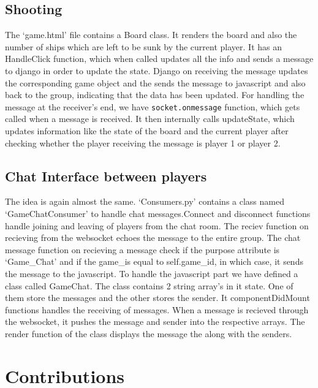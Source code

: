 \documentclass[titlepage]{article}
\begin{document}
\subsection{Shooting}
The `game.html' file contains a Board class. It renders the board and also the number of ships which are left to be sunk by the current player. It has an HandleClick function, which when called updates all the info and sends a message to django in order to update the state. Django on receiving the message updates the corresponding game object and the sends the message to javascript and also back to the group, indicating that the data has been updated.
For handling the message at the receiver's end, we have \texttt{socket.onmessage} function, which gets called when a message is received. It then internally calls updateState, which updates information like the state of the board and the current player after checking whether the player receiving the message is player 1 or player 2.

\subsection{Chat Interface between players}
The idea is again almost the same. `Consumers.py' contains a class named `GameChatConsumer' to handle chat messages.Connect and disconnect functions handle joining and leaving of players from the chat room. The reciev function on recieving from the websocket echoes the message to the entire group. The chat message function on recieving a message check if the purpose attribute is `Game\_Chat' and if the game\_is equal to self.game\_id, in which case, it sends the message to the javascript. To handle the javascript part we have defined a class called GameChat. The class contains 2 string array's in it state. One of them store the messages and the other stores the sender. It componentDidMount functions handles the receiving of messages. When a message is recieved through the websocket, it pushes the message and sender into the respective arrays. The render function of the class displays the message the along with the senders.
\section{Contributions}
\end{document}
